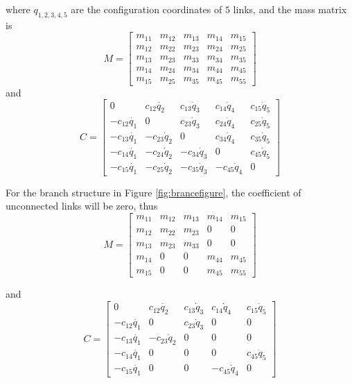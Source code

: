 {where $q_{1,2,3,4,5}$ are the configuration coordinates of $5$ links,
and the mass matrix is
\[
M=\left[\begin{array}{ccccc}
m_{11} & m_{12} & m_{13} & m_{14} & m_{15}\\
m_{12} & m_{22} & m_{23} & m_{24} & m_{25}\\
m_{13} & m_{23} & m_{33} & m_{34} & m_{35}\\
m_{14} & m_{24} & m_{34} & m_{44} & m_{45}\\
m_{15} & m_{25} & m_{35} & m_{45} & m_{55}\end{array}\right]
\]
and
\[
C=\left[\begin{array}{ccccc}
0 & c_{12}\dot{q_{2}} & c_{13}\dot{q}_{3} & c_{14}\dot{q}_{4} & c_{15}\dot{q}_{5}\\
-c_{12}\dot{q_{1}} & 0 & c_{23}\dot{q}_{3} & c_{24}\dot{q}_{4} & c_{25}\dot{q}_{5}\\
-c_{13}\dot{q_{1}} & -c_{23}\dot{q}_{2} & 0 & c_{34}\dot{q}_{4} & c_{35}\dot{q}_{5}\\
-c_{14}\dot{q_{1}} & -c_{24}\dot{q}_{2} & -c_{34}\dot{q}_{3} & 0 & c_{45}\dot{q}_{5}\\
-c_{15}\dot{q_{1}} & -c_{25}\dot{q}_{2} & -c_{35}\dot{q}_{3} & -c_{45}\dot{q}_{4} & 0\end{array}\right]
\]





For the branch structure in Figure \ref{fig:brancefigure},
the coefficient of unconnected links will be zero, thus
\[
M=\left[\begin{array}{ccccc}
m_{11} & m_{12} & m_{13} & m_{14} & m_{15}\\
m_{12} & m_{22} & m_{23} & 0 & 0\\
m_{13} & m_{23} & m_{33} & 0 & 0\\
m_{14} & 0 & 0 & m_{44} & m_{45}\\
m_{15} & 0 & 0 & m_{45} & m_{55}\end{array}\right]
\]

and
\[
C=\left[\begin{array}{ccccc}
0 & c_{12}\dot{q_{2}} & c_{13}\dot{q}_{3} & c_{14}\dot{q}_{4} & c_{15}\dot{q}_{5}\\
-c_{12}\dot{q_{1}} & 0 & c_{23}\dot{q}_{3} & 0 & 0\\
-c_{13}\dot{q_{1}} & -c_{23}\dot{q}_{2} & 0 & 0 & 0\\
-c_{14}\dot{q_{1}} & 0 & 0 & 0 & c_{45}\dot{q}_{5}\\
-c_{15}\dot{q_{1}} & 0 & 0 & -c_{45}\dot{q}_{4} & 0\end{array}\right]
\]








}
